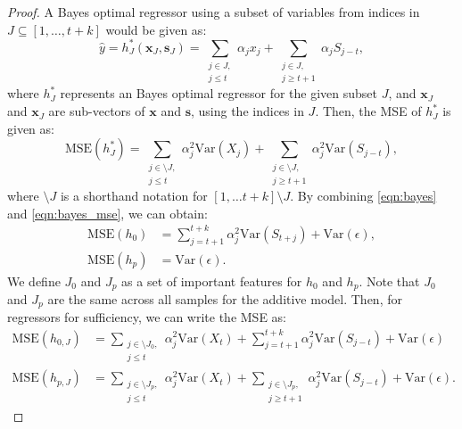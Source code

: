 \begin{proof}
    A Bayes optimal  regressor using a subset of variables from indices in $J \subseteq [1, \ldots, t+k]$ would be given as:
    \begin{equation} \label{eqn:bayes}
        \hat{y} = h^{*}_J(\mathbf{x}_J, \mathbf{s}_J) = \sum_{\substack{j \in J, \\ j \leq t}} \alpha_j x_j + \sum_{\substack{j \in J, \\ j 
        \geq t+1}} \alpha_j S_{j-t}, 
    \end{equation}
    where $h^{*}_J$ represents an Bayes optimal regressor for the given subset $J$, and $\mathbf{x}_J$ and $\mathbf{x}_J$ are sub-vectors of $\mathbf{x}$ and $\mathbf{s}$, using the indices in $J$. Then, the MSE of $h^{*}_J$ is given as: 
    \begin{equation} \label{eqn:bayes_mse}
        \text{MSE}(h^{*}_J) =   \sum_{\substack{j \in \setminus J, \\ j \leq t}} \alpha_j^2  \text{Var}(X_j) + \sum_{\substack{j \in \setminus J, \\ j 
        \geq t+1}} \alpha_j^2 \text{Var}(S_{j-t}),
    \end{equation}
    where $\setminus J$ is a shorthand notation for $[1, \ldots t+k] \setminus J$. By combining \eqref{eqn:bayes} and \eqref{eqn:bayes_mse}, we can obtain: 
    \begin{align}
        \text{MSE}(h_0) &= \sum_{j=t+1}^{t+k} \alpha_j^2 \text{Var}(S_{t+j}) + \text{Var} (\epsilon), \label{eqn:mse_h0} \\ 
        \text{MSE}(h_p) &= \text{Var} (\epsilon). \label{eqn:mse_hp}
    \end{align}
    We define $J_0$ and $J_p$ as a set of important features for $h_0$ and $h_p$. Note that $J_0$ and $J_p$ are the same across all samples for the additive model. Then, for regressors for sufficiency, we can write the MSE as: 
    \begin{align}
        \text{MSE}(h_{0,J}) &=  \sum_{\substack{j \in \setminus J_0, \\ j \leq t}}\alpha_j^2 \text{Var}(X_{t})  +  \sum_{j=t+1}^{t+k} \alpha_j^2 \text{Var}(S_{j-t}) + \text{Var} (\epsilon) \\ 
        \text{MSE}(h_{p,J}) &= \sum_{\substack{j \in \setminus J_p, \\ j \leq t}}\alpha_j^2 \text{Var}(X_{t}) + \sum_{\substack{j \in \setminus J_p, \\ j \geq t+1}}\alpha_j^2 \text{Var}(S_{j-t}) + \text{Var} (\epsilon).

\end{align}
\end{proof}

